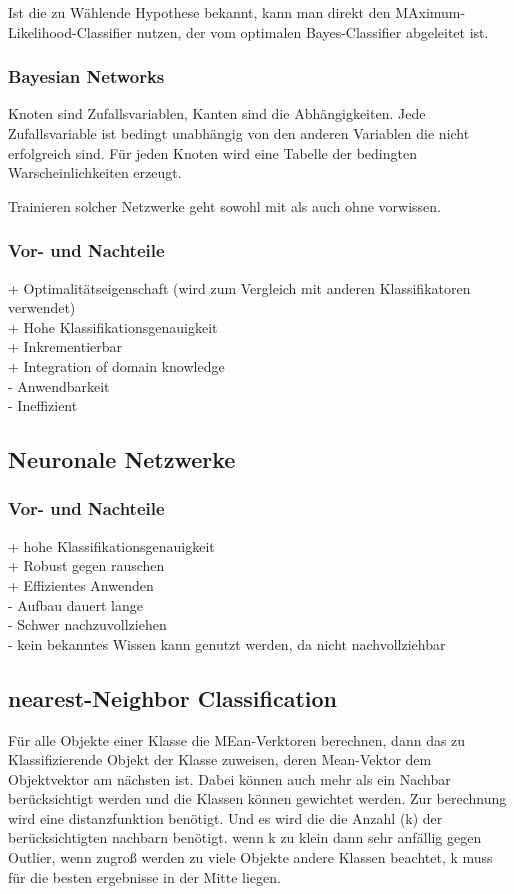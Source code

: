 \documentclass[a4paper]{scrartcl}
\begin{document}
Ist die zu Wählende Hypothese bekannt, kann man direkt den MAximum-Likelihood-Classifier nutzen, der vom optimalen Bayes-Classifier abgeleitet ist.\\

\subsubsection{Bayesian Networks}
Knoten sind Zufallsvariablen, Kanten sind die Abhängigkeiten. Jede Zufallsvariable ist bedingt unabhängig von den anderen Variablen die nicht erfolgreich sind. Für jeden Knoten wird eine Tabelle der bedingten Warscheinlichkeiten erzeugt. 

Trainieren solcher Netzwerke geht sowohl mit als auch ohne vorwissen.

\subsubsection{Vor- und Nachteile}
+ Optimalitätseigenschaft (wird zum Vergleich mit anderen Klassifikatoren verwendet)\\
+ Hohe Klassifikationsgenauigkeit\\
+ Inkrementierbar\\
+ Integration of domain knowledge\\
- Anwendbarkeit\\
- Ineffizient\\
\subsection{Neuronale Netzwerke}
\subsubsection{Vor- und Nachteile}
+ hohe Klassifikationsgenauigkeit\\
+ Robust gegen rauschen\\
+ Effizientes Anwenden\\
- Aufbau dauert lange\\
- Schwer nachzuvollziehen\\
- kein bekanntes Wissen kann genutzt werden, da nicht nachvollziehbar\\

\subsection{nearest-Neighbor Classification}
Für alle Objekte einer Klasse die MEan-Verktoren berechnen, dann das zu Klassifizierende Objekt der Klasse zuweisen, deren Mean-Vektor dem Objektvektor am nächsten ist. Dabei können  auch mehr als ein Nachbar berücksichtigt werden und die Klassen können gewichtet werden. Zur berechnung wird eine distanzfunktion benötigt. Und es wird die die Anzahl (k) der berücksichtigten nachbarn benötigt. wenn k zu klein dann sehr anfällig gegen Outlier, wenn zugroß werden zu viele Objekte andere Klassen beachtet, k muss für die besten ergebnisse in der Mitte liegen.
\end{document}
